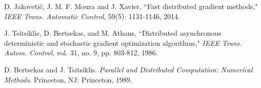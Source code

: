 \documentclass[a4paper, 11pt]{article}
\begin{document}
\begin{thebibliography}{99}
 D. Jakoveti\'{c}, J. M. F. Moura and J. Xavier, ``Fast distributed gradient methods," {\em IEEE
Trans. Automatic Control}, 59(5):  1131-1146, 2014.

J. Tsitsiklis, D. Bertsekas, and M. Athans, ``Distributed asynchronous
deterministic and stochastic gradient optimization algorithms," {\em IEEE Trans. Autom. Control}, vol. 31, no. 9, pp. 803-812, 1986.

 D. Bertsekas and J. Tsitsiklis. {\em Parallel and Distributed Computation:
Numerical Methods}. Princeton, NJ: Princeton, 1989.

\end{thebibliography}
\end{document}
